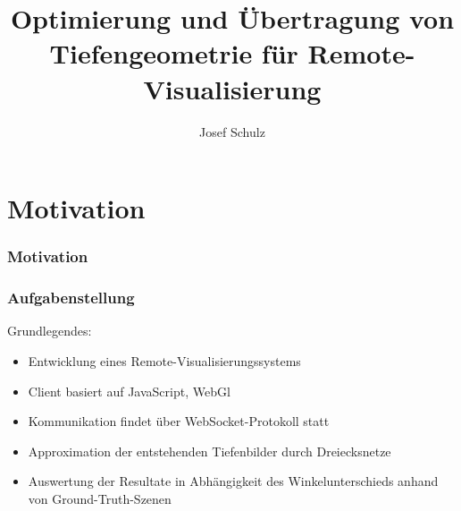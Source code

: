 \documentclass[xcolor=dvipsnames]{beamer}
\title{Optimierung und Übertragung von Tiefengeometrie
für Remote-Visualisierung}
\author{Josef Schulz}
\institute{Technische Universität Dresden}
\begin{document}
\begin{frame}
	\maketitle
	\nocite*{}
	\thispagestyle{empty}
\end{frame}

\section{Motivation}
\begin{frame}
	\frametitle{Motivation}
	\begin{figure}
	\centering
	
		\end{figure}
\end{frame}

\begin{frame}
	\frametitle{Aufgabenstellung}
	
	Grundlegendes:
	\begin{itemize}
		\item Entwicklung eines Remote-Visualisierungssystems
		\item Client basiert auf JavaScript, WebGl
		\item Kommunikation findet über WebSocket-Protokoll statt
	\end{itemize}
	\vspace{1cm}
	
	\begin{itemize}
		\item Approximation der entstehenden Tiefenbilder durch Dreiecksnetze
		\item Auswertung der Resultate in Abhängigkeit des Winkelunterschieds anhand von Ground-Truth-Szenen
	\end{itemize}
\end{frame}
\end{document}
